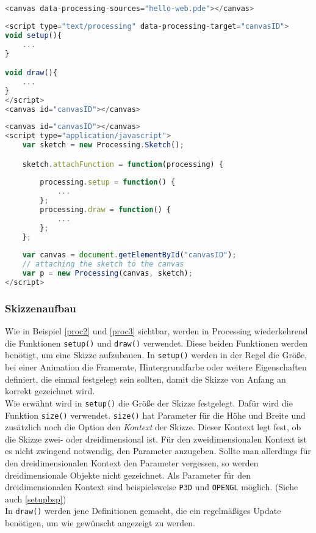 \documentclass[12pt, ngerman, utf8]{article}
\begin{document}
\begin{lstlisting}[language=JavaScript, caption={Einbinden in Canvas-Tag},label=proc1]
<canvas data-processing-sources="hello-web.pde"></canvas>
\end{lstlisting}

\begin{lstlisting}[language=JavaScript, caption={Processing-Code in Script-Tag},label=proc2]
<script type="text/processing" data-processing-target="canvasID">
void setup(){
    ...
}

void draw(){
    ...
}
</script>
<canvas id="canvasID"></canvas>
\end{lstlisting}

\begin{lstlisting}[language=JavaScript, caption={Processing.js als Library in JavaScript},label=proc3]
<canvas id="canvasID"></canvas>
<script type="application/javascript">
    var sketch = new Processing.Sketch();

    sketch.attachFunction = function(processing) {
        
        processing.setup = function() {
        	...
        };
        processing.draw = function() {
            ...
        };        
    };
    
    var canvas = document.getElementById("canvasID");
    // attaching the sketch to the canvas
    var p = new Processing(canvas, sketch);
</script>
\end{lstlisting}

\subsubsection{Skizzenaufbau}
Wie in Beispiel \ref{proc2} und \ref{proc3} sichtbar, werden in Processing wiederkehrend die Funktionen \texttt{setup()} und \texttt{draw()} verwendet. Diese beiden Funktionen werden benötigt, um eine Skizze aufzubauen. In \texttt{setup()} werden in der Regel die Größe, bei einer Animation die Framerate, Hintergrundfarbe oder weitere Eigenschaften definiert, die einmal festgelegt sein sollten, damit die Skizze von Anfang an korrekt gezeichnet wird.\\
Wie erwähnt wird in \texttt{setup()} die Größe der Skizze festgelegt. Dafür wird die Funktion \texttt{size()} verwendet. \texttt{size()} hat Parameter für die Höhe und Breite und zusätzlich noch die Option den \emph{Kontext} der Skizze. Dieser Kontext legt fest, ob die Skizze zwei- oder dreidimensional ist. Für den zweidimensionalen Kontext ist es nicht zwingend notwendig, den Parameter anzugeben. Sollte man allerdings für den dreidimensionalen Kontext den Parameter vergessen, so werden dreidimensionale Objekte nicht gezeichnet. Als Parameter für den dreidimensionalen Kontext sind beispielsweise \texttt{P3D} und \texttt{OPENGL} möglich. (Siehe auch \ref{setupbsp})\\
In \texttt{draw()} werden jene Definitionen gemacht, die ein regelmäßiges Update benötigen, um wie gewünscht angezeigt zu werden.
\end{document}
